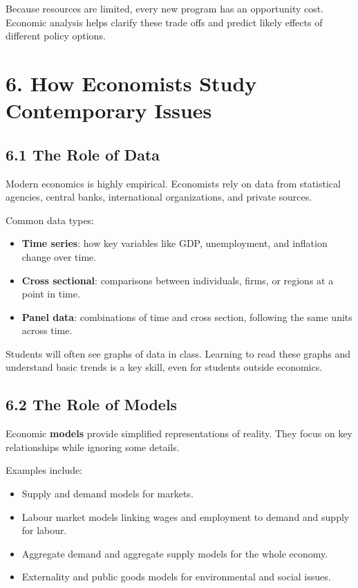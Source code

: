 \documentclass[12pt]{article}
\begin{document}
Because resources are limited, every new program has an opportunity cost. Economic analysis helps clarify these trade offs and predict likely effects of different policy options.

\section*{6. How Economists Study Contemporary Issues}

\subsection*{6.1 The Role of Data}

Modern economics is highly empirical. Economists rely on data from statistical agencies, central banks, international organizations, and private sources.

Common data types:

\begin{itemize}[noitemsep]
    \item \textbf{Time series}: how key variables like GDP, unemployment, and inflation change over time.
    \item \textbf{Cross sectional}: comparisons between individuals, firms, or regions at a point in time.
    \item \textbf{Panel data}: combinations of time and cross section, following the same units across time.
\end{itemize}

Students will often see graphs of data in class. Learning to read these graphs and understand basic trends is a key skill, even for students outside economics.

\subsection*{6.2 The Role of Models}

Economic \textbf{models} provide simplified representations of reality. They focus on key relationships while ignoring some details.

Examples include:

\begin{itemize}[noitemsep]
    \item Supply and demand models for markets.
    \item Labour market models linking wages and employment to demand and supply for labour.
    \item Aggregate demand and aggregate supply models for the whole economy.
    \item Externality and public goods models for environmental and social issues.
\end{itemize}
\end{document}
